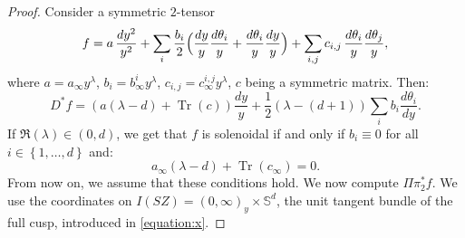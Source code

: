 \documentclass[10pt]{amsart}
\newcommand{\Ss}{\mathbb{S}}
\DeclareMathOperator{\Tr}{Tr}
\theoremstyle{plain}
\theoremstyle{definition}
\begin{document}
\begin{proof}
Consider a symmetric $2$-tensor
\[
f = a\, \frac{dy^2}{y^2} + \sum_i \frac{b_i}{2}\Bigl(\frac{dy}{y}\frac{d\theta_i}{y}+\frac{d\theta_i}{y}\frac{dy}{y}\Bigr) + \sum_{i,j} c_{i,j}\, \frac{d\theta_i}{y}\frac{d\theta_j}{y},
\]
where $a = a_\infty y^\lambda$, $b_i = b^i_\infty y^\lambda$, $c_{i,j}=c_\infty^{i,j} y^\lambda$, $c$ being a symmetric matrix. Then:
\begin{equation}
\label{equation:d-star}
D^*f = \left(a(\lambda-d)+\Tr(c)\right) \dfrac{dy}{y} + \dfrac{1}{2}(\lambda-(d+1))\sum_i b_i \dfrac{d\theta_i}{dy}.
\end{equation}
If $\Re(\lambda) \in (0,d)$, we get that $f$ is solenoidal if and only if $b_i \equiv 0$ for all $i \in \left\{1,\dots,d\right\}$ and:
\begin{equation}
a_\infty(\lambda-d)+\Tr(c_\infty) = 0.
\end{equation}
From now on, we assume that these conditions hold. We now compute $\Pi \pi_2^* f$. We use the coordinates on $I(SZ) = (0,\infty)_y \times \Ss^d$, the unit tangent bundle of the full cusp, introduced in \eqref{equation:x}.


\end{proof}
\end{document}
